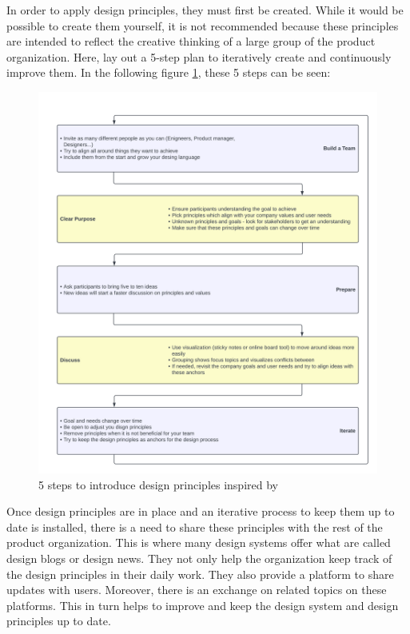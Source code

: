 In order to apply design principles, they must first be created. While it would be possible to create them yourself, it is not recommended because these principles are intended to reflect the creative thinking of a large group of the product organization. Here, \citet{vesselov_building_2019} lay out a 5-step plan to iteratively create and continuously improve them. In the following figure \ref{design_principles_steps}, these 5 steps can be seen:
\newpage


\begin{figure}[htbp]
\centerline{\includegraphics[width=\linewidth]{images/design_principles_steps.png}}
\caption{5 steps to introduce design principles inspired by  \citet{vesselov_building_2019}}
\label{design_principles_steps}
\end{figure}
Once design principles are in place and an iterative process to keep them up to date is installed, there is a need to share these principles with the rest of the product organization. This is where many design systems offer what are called design blogs or design news. They not only help the organization keep track of the design principles in their daily work. They also provide a platform to share updates with users.  Moreover, there is an exchange on related topics on these platforms. This in turn helps to improve and keep the design system and design principles up to date.  \cite{google_material_2022}\\

